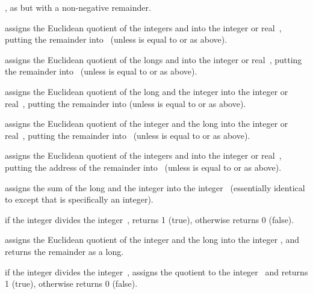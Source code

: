 , as  but with a
non-negative remainder.

 assigns the Euclidean
quotient of the integers  and  into the integer or real~,
putting the remainder into~ (unless  is equal to  or
 as above).

 assigns the Euclidean
quotient of the longs  and  into the integer or real~,
putting the remainder into~ (unless  is equal to  or
 as above).

 assigns the Euclidean
quotient of the long  and the integer  into the integer or
real~, putting the remainder into  (unless  is equal
to  or  as above).

 assigns the Euclidean
quotient of the integer  and the long  into the integer or
real~, putting the remainder into~ (unless  is equal
to  or  as above).

 assigns the Euclidean
quotient of the integers  and  into the integer or real~,
putting the address of the remainder into~ (unless  is equal
to  or  as above).


 assigns the sum of the long 
and the integer  into the integer~ (essentially identical to
 except that  is specifically an integer).

 if the integer  divides the
integer~, returns 1 (true), otherwise returns 0 (false).

 assigns the Euclidean quotient of
the integer  and the long  into the integer , and returns
the remainder as a long.

 if the integer  divides the
integer~, assigns the quotient to the integer~ and returns
1 (true), otherwise returns 0 (false).

